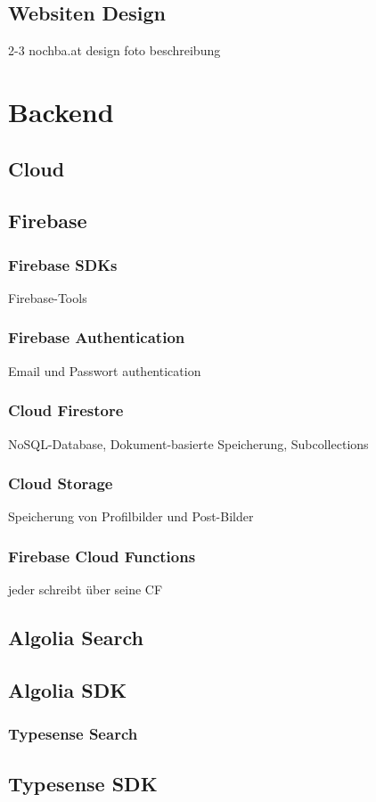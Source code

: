 \subsection{Websiten Design}
2-3 nochba.at design foto
beschreibung

\section{Backend}
\subsection{Cloud}
\author{Martin Hausleitner}

\subsection{Firebase}
\author{Martin Hausleitner}

\subsubsection{Firebase SDKs}
\author{Sandin Habibovic}
Firebase-Tools

\subsubsection{Firebase Authentication}
\author{Sandin Habibovic}
Email und Passwort authentication

\subsubsection{Cloud Firestore}
\author{Sandin Habibovic}
NoSQL-Database, Dokument-basierte Speicherung, Subcollections
\subsubsection{Cloud Storage}
\author{Sandin Habibovic}
Speicherung von Profilbilder und Post-Bilder
\subsubsection{Firebase Cloud Functions}
jeder schreibt über seine CF

\subsection{Algolia Search}
\subsection{Algolia SDK}

\subsubsection{Typesense Search}
\subsection{Typesense SDK}
